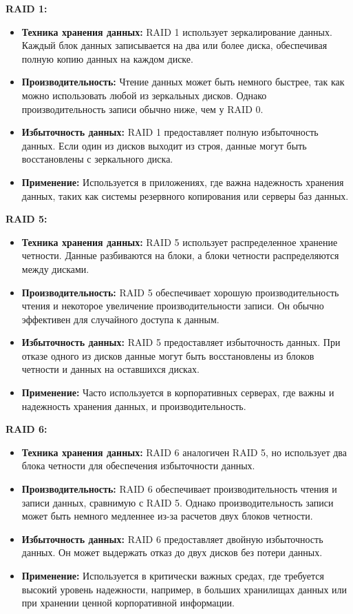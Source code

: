 \documentclass[10pt,a4paper,final]{article} %
\begin{document}
{\large \textbf{RAID 1:}}
\begin{itemize}
	\item \textbf{Техника хранения данных:} RAID 1 использует зеркалирование данных. Каждый блок данных записывается на два или более диска, обеспечивая полную копию данных на каждом диске.
	\item \textbf{Производительность:} Чтение данных может быть немного быстрее, так как можно использовать любой из зеркальных дисков. Однако производительность записи обычно ниже, чем у RAID 0.
	\item \textbf{Избыточность данных:} RAID 1 предоставляет полную избыточность данных. Если один из дисков выходит из строя, данные могут быть восстановлены с зеркального диска.
	\item \textbf{Применение:} Используется в приложениях, где важна надежность хранения данных, таких как системы резервного копирования или серверы баз данных.
\end{itemize}

{\large \textbf{RAID 5:}}
\begin{itemize}
	\item \textbf{Техника хранения данных:} RAID 5 использует распределенное хранение четности. Данные разбиваются на блоки, а блоки четности распределяются между дисками.
	\item \textbf{Производительность:} RAID 5 обеспечивает хорошую производительность чтения и некоторое увеличение производительности записи. Он обычно эффективен для случайного доступа к данным.
	\item \textbf{Избыточность данных:} RAID 5 предоставляет избыточность данных. При отказе одного из дисков данные могут быть восстановлены из блоков четности и данных на оставшихся дисках.
	\item \textbf{Применение:} Часто используется в корпоративных серверах, где важны и надежность хранения данных, и производительность.
\end{itemize}

{\large \textbf{RAID 6:}}
\begin{itemize}
	\item \textbf{Техника хранения данных:} RAID 6 аналогичен RAID 5, но использует два блока четности для обеспечения избыточности данных.
	\item \textbf{Производительность:} RAID 6 обеспечивает производительность чтения и записи данных, сравнимую с RAID 5. Однако производительность записи может быть немного медленнее из-за расчетов двух блоков четности.
	\item \textbf{Избыточность данных:} RAID 6 предоставляет двойную избыточность данных. Он может выдержать отказ до двух дисков без потери данных.
	\item \textbf{Применение:} Используется в критически важных средах, где требуется высокий уровень надежности, например, в больших хранилищах данных или при хранении ценной корпоративной информации.
\end{itemize}
\end{document}
